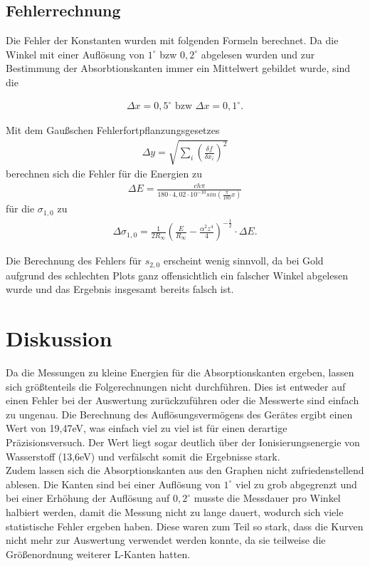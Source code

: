 \subsection{Fehlerrechnung}
Die Fehler der Konstanten wurden mit folgenden Formeln berechnet. Da die Winkel mit einer Auflösung von $1^\circ$ bzw $0,2^\circ$ abgelesen wurden und zur Bestimmung der Absorbtionskanten immer ein Mittelwert gebildet wurde, sind die

\begin{align*}
\Delta x = 0,5^\circ \text{ bzw } \Delta x = 0,1^\circ.
\end{align*}

Mit dem Gaußschen Fehlerfortpflanzungsgesetzes 
\begin{align}
\Delta y = \sqrt{\sum\limits_i \left( \frac{\delta f}{\delta x_i}\right)  ^2}
\end{align}
berechnen sich die Fehler für die Energien zu
\begin{align}
\Delta E = \frac{ch\pi}{180\cdot 4,02\cdot 10^{-10}sin\left(\frac{\pi}{180}x\right)}
\end{align}
für die $\sigma_{1,0}$ zu
\begin{align}
\Delta \sigma_{1,0} = \frac{1}{2R_\infty}\left(\frac{E}{R_\infty}-\frac{\alpha^2 z^4}{4}\right)^{-\frac{1}{2}}\cdot \Delta E.
\end{align}

Die Berechnung des Fehlers für $s_{2,0}$ erscheint wenig sinnvoll, da bei Gold aufgrund des schlechten Plots ganz offensichtlich ein falscher Winkel abgelesen wurde und das Ergebnis insgesamt bereits falsch ist.


\section{Diskussion}
Da die Messungen zu kleine Energien für die Absorptionskanten ergeben, lassen sich größtenteils die Folgerechnungen nicht durchführen. Dies ist entweder auf einen Fehler bei der Auswertung zurückzuführen oder die Messwerte sind einfach zu ungenau. Die Berechnung des Auflösungsvermögens des Gerätes ergibt einen Wert von 19,47eV, was einfach viel zu viel ist für einen derartige Präzisionsversuch. Der Wert liegt sogar deutlich über der Ionisierungsenergie von Wasserstoff (13,6eV) und verfälscht somit die Ergebnisse stark.\\
Zudem lassen sich die Absorptionskanten aus den Graphen nicht zufriedenstellend ablesen. Die Kanten sind bei einer Auflösung von $1^\circ$ viel zu grob abgegrenzt und bei einer Erhöhung der Auflösung auf $0,2^\circ$ musste die Messdauer pro Winkel halbiert werden, damit die Messung nicht zu lange dauert, wodurch sich viele statistische Fehler ergeben haben. Diese waren zum Teil so stark, dass die Kurven nicht mehr zur Auswertung verwendet werden konnte, da sie teilweise die Größenordnung weiterer L-Kanten hatten.



